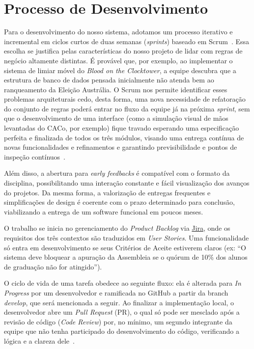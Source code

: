 \documentclass[12pt,a4paper]{article}
\begin{document}
\section{Processo de Desenvolvimento}
Para o desenvolvimento do nosso sistema, adotamos um processo iterativo e incremental em ciclos curtos de duas semanas (\textit{sprints}) baseado em Scrum~\cite{sommerville2015}. Essa escolha se justifica pelas características do nosso projeto de lidar com regras de negócio altamente distintas. É provável que, por exemplo, ao implementar o sistema de limiar móvel do \textit{Blood on the Clocktower}, a equipe descubra que a estrutura de banco de dados pensada inicialmente não atenda bem ao ranqueamento da Eleição Austrália. O Scrum nos permite identificar esses problemas arquiteturais cedo, desta forma, uma nova necessidade de refatoração do conjunto de regras poderá entrar no fluxo da equipe já na próxima \textit{sprint}, sem que o desenvolvimento de uma interface (como a simulação visual de mãos levantadas do CACo, por exemplo) fique travado esperando uma especificação perfeita e finalizada de todos os três módulos, visando uma entrega contínua de novas funcionalidades e refinamentos e garantindo previsibilidade e pontos de inspeção contínuos~\cite{fowler2001}.

Além disso, a abertura para \textit{early feedbacks} é compatível com o formato da disciplina, possibilitando uma interação constante e fácil visualização dos avanços do projetos. Da mesma forma, a valorização de entregas frequentes e simplificações de design é coerente com o prazo determinado para conclusão, viabilizando a entrega de um software funcional em poucos meses.

O trabalho se inicia no gerenciamento do \textit{Product Backlog} via \href{https://www.atlassian.com/br/software/jira}{Jira}, onde os requisitos dos três contextos são traduzidos em \textit{User Stories}. Uma funcionalidade só entra em desenvolvimento se seus Critérios de Aceite estiverem claros (ex: ``O sistema deve bloquear a apuração da Assembleia se o quórum de 10\% dos alunos de graduação não for atingido'').

O ciclo de vida de uma tarefa obedece ao seguinte fluxo: ela é alterada para \textit{In Progress} por um desenvolvedor e ramificada no GitHub a partir da branch \textit{develop}, que será mencionada a seguir. Ao finalizar a implementação local, o desenvolvedor abre um \textit{Pull Request} (PR), o qual só pode ser mesclado após a revisão de código (\textit{Code Review}) por, no mínimo, um segundo integrante da equipe que não tenha participado do desenvolvimento do código, verificando a lógica e a clareza dele~\cite{pressman2016}.
\end{document}
